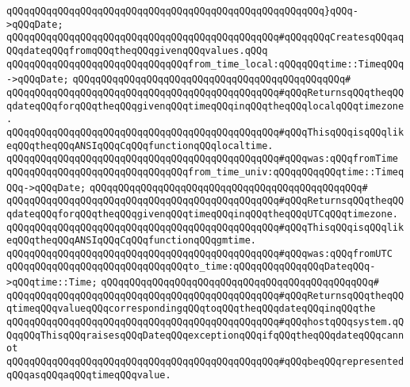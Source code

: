 \verb|qQQqqQQqqQQqqQQqqQQqqQQqqQQqqQQqqQQqqQQqqQQqqQQqqQQqqQQq}qQQq->qQQqDate;|\newline
\verb|qQQqqQQqqQQqqQQqqQQqqQQqqQQqqQQqqQQqqQQqqQQqqQQq#qQQqqQQqCreatesqQQqaqQQqdateqQQqfromqQQqtheqQQqgivenqQQqvalues.qQQq|\newline
\newline
\verb|qQQqqQQqqQQqqQQqqQQqqQQqqQQqqQQqfrom_time_local:qQQqqQQqtime::TimeqQQq->qQQqDate;|\newline
\verb|qQQqqQQqqQQqqQQqqQQqqQQqqQQqqQQqqQQqqQQqqQQqqQQq#|\newline
\verb|qQQqqQQqqQQqqQQqqQQqqQQqqQQqqQQqqQQqqQQqqQQqqQQq#qQQqReturnsqQQqtheqQQqdateqQQqforqQQqtheqQQqgivenqQQqtimeqQQqinqQQqtheqQQqlocalqQQqtimezone.|\newline
\verb|qQQqqQQqqQQqqQQqqQQqqQQqqQQqqQQqqQQqqQQqqQQqqQQq#qQQqThisqQQqisqQQqlikeqQQqtheqQQqANSIqQQqCqQQqfunctionqQQqlocaltime.|\newline
\verb|qQQqqQQqqQQqqQQqqQQqqQQqqQQqqQQqqQQqqQQqqQQqqQQq#qQQqwas:qQQqfromTime|\newline
\newline
\newline
\verb|qQQqqQQqqQQqqQQqqQQqqQQqqQQqqQQqfrom_time_univ:qQQqqQQqqQQqtime::TimeqQQq->qQQqDate;|\newline
\verb|qQQqqQQqqQQqqQQqqQQqqQQqqQQqqQQqqQQqqQQqqQQqqQQq#|\newline
\verb|qQQqqQQqqQQqqQQqqQQqqQQqqQQqqQQqqQQqqQQqqQQqqQQq#qQQqReturnsqQQqtheqQQqdateqQQqforqQQqtheqQQqgivenqQQqtimeqQQqinqQQqtheqQQqUTCqQQqtimezone.|\newline
\verb|qQQqqQQqqQQqqQQqqQQqqQQqqQQqqQQqqQQqqQQqqQQqqQQq#qQQqThisqQQqisqQQqlikeqQQqtheqQQqANSIqQQqCqQQqfunctionqQQqgmtime.|\newline
\verb|qQQqqQQqqQQqqQQqqQQqqQQqqQQqqQQqqQQqqQQqqQQqqQQq#qQQqwas:qQQqfromUTC|\newline
\newline
\verb|qQQqqQQqqQQqqQQqqQQqqQQqqQQqqQQqto_time:qQQqqQQqqQQqqQQqDateqQQq->qQQqtime::Time;|\newline
\verb|qQQqqQQqqQQqqQQqqQQqqQQqqQQqqQQqqQQqqQQqqQQqqQQq#|\newline
\verb|qQQqqQQqqQQqqQQqqQQqqQQqqQQqqQQqqQQqqQQqqQQqqQQq#qQQqReturnsqQQqtheqQQqtimeqQQqvalueqQQqcorrespondingqQQqtoqQQqtheqQQqdateqQQqinqQQqthe|\newline
\verb|qQQqqQQqqQQqqQQqqQQqqQQqqQQqqQQqqQQqqQQqqQQqqQQq#qQQqhostqQQqsystem.qQQqqQQqThisqQQqraisesqQQqDateqQQqexceptionqQQqifqQQqtheqQQqdateqQQqcannot|\newline
\verb|qQQqqQQqqQQqqQQqqQQqqQQqqQQqqQQqqQQqqQQqqQQqqQQq#qQQqbeqQQqrepresentedqQQqasqQQqaqQQqtimeqQQqvalue.|\newline
